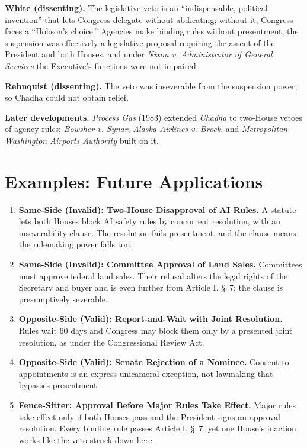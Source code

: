 \documentclass[12pt]{article}
\begin{document}
\textbf{White (dissenting).} The legislative veto is an ``indispensable, political invention'' that lets Congress delegate without abdicating; without it, Congress faces a ``Hobson's choice.'' Agencies make binding rules without presentment, the suspension was effectively a legislative proposal requiring the assent of the President and both Houses, and under \textit{Nixon v. Administrator of General Services} the Executive's functions were not impaired.

\textbf{Rehnquist (dissenting).} The veto was inseverable from the suspension power, so Chadha could not obtain relief.

\textbf{Later developments.} \textit{Process Gas} (1983) extended \textit{Chadha} to two-House vetoes of agency rules; \textit{Bowsher v. Synar}, \textit{Alaska Airlines v. Brock}, and \textit{Metropolitan Washington Airports Authority} built on it.

\section{Examples: Future Applications}

\begin{enumerate}
\item \textbf{Same-Side (Invalid): Two-House Disapproval of AI Rules.} A statute lets both Houses block AI safety rules by concurrent resolution, with an inseverability clause. The resolution fails presentment, and the clause means the rulemaking power falls too.
\item \textbf{Same-Side (Invalid): Committee Approval of Land Sales.} Committees must approve federal land sales. Their refusal alters the legal rights of the Secretary and buyer and is even further from Article I, \S~7; the clause is presumptively severable.
\item \textbf{Opposite-Side (Valid): Report-and-Wait with Joint Resolution.} Rules wait 60 days and Congress may block them only by a presented joint resolution, as under the Congressional Review Act.
\item \textbf{Opposite-Side (Valid): Senate Rejection of a Nominee.} Consent to appointments is an express unicameral exception, not lawmaking that bypasses presentment.
\item \textbf{Fence-Sitter: Approval Before Major Rules Take Effect.} Major rules take effect only if both Houses pass and the President signs an approval resolution. Every binding rule passes Article I, \S~7, yet one House's inaction works like the veto struck down here.
\end{enumerate}
\end{document}
